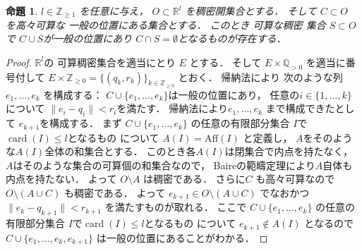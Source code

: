 \documentclass[leqno, a4paper, 12pt]{jsarticle}
\newtheorem{prop}[thm]{命題}
\newcommand{\zz}{\mathbb{Z}}
\newcommand{\qq}{\mathbb{Q}}
\newcommand{\rr}{\mathbb{R}}
\DeclareMathOperator{\card}{card}
\newcommand{\yoaff}[1]{\mathrm{Aff}(#1)}
\numberwithin{equation}{section}
\begin{document}
\begin{prop}\label{prop:densegp}
$l\in \zz_{\ge 1}$
を任意に与え，
$O\subset \rr^{l}$
を稠密開集合とする．
そして
$C\subset O$
を高々可算な
一般の位置にある集合とする．
このとき
可算な稠密
集合
$S\subset O$で
$C\cup S$が一般の位置にあり
$C\cap S=\emptyset$となるものが存在する．
\end{prop}
\begin{proof}
$\rr^{l}$の
可算稠密集合を適当にとり
$E$
とする．
そして
$E\times \qq_{>0}$
を適当に番号付して
$E\times \zz_{\ge 0}=\{(q_{k}, r_{k})\}_{k\in \zz_{\ge 0}}$
とおく．
帰納法により
次のような列
$e_{1}, \dots, e_{k}$
を構成する：
$C\cup \{e_{1}, \dots, e_{k}\}$は一般の位置にあり，
任意の$i\in \{1, \dots, k\}$について
$\lVert e_{i} - q_{i}\lVert < r_{i}$を満たす．
帰納法により$e_{1}, \dots, e_{k}$
まで構成できたとして
$e_{k+1}$を構成する．
まず
$C\cup \{e_{1}, \dots, e_{k}\}$
の任意の有限部分集合
$I$で$\card(I)\le l$となるもの
について
$A(I)=\yoaff{I}$
と定義し，
$A$をそのような$A(I)$全体の和集合とする．
このとき各$A(I)$は閉集合で内点を持たなく，
$A$はそのような集合の可算個の和集合なので，
Baireの範疇定理により$A$自体も内点を持たない．
よって
$O\setminus A$
は稠密である．
さらに$C$
も高々可算なので
$O\setminus (A\cup C)$
も稠密である．
よって
$e_{k+1} \in O\setminus (A\cup C)$
でなおかつ
$\lVert e_{k} - q_{k+1}\lVert < r_{k+1}$
を満たすものが取れる．
ここで
$C\cup \{e_{1}, \dots, e_{k}\}$
の任意の有限部分集合
$I$で$\card(I)\le l$となるもの
について
$e_{k+1}\not \in A(I)$
となるので
$C\cup \{e_{1},\dots, e_{k}, e_{k+1}\}$
は一般の位置にあることがわかる．
\end{proof}
\end{document}

